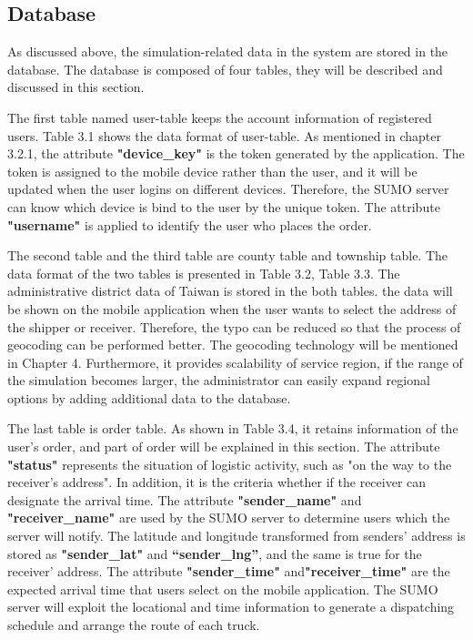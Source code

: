 \documentclass[12pt]{ksthesis}
\begin{document}
\begin{thesis}
{\section{Database}
As discussed above, the simulation-related data in the system are stored in the database. The database is composed of four tables, they will be described and discussed in this section.
 
The first table named user-table keeps the account information of registered users. Table 3.1 shows the data format of user-table. As mentioned in chapter 3.2.1, the attribute \textbf{"device\_key"} is the token generated by the application. The token is assigned to the mobile device rather than the user, and it will be updated when the user logins on different devices. Therefore, the SUMO server can know which device is bind to the user by the unique token. The attribute \textbf{"username"} is applied to identify the user who places the order. 

The second table and the third table are county table and township table. The data format of the two tables is presented in Table 3.2, Table 3.3. The administrative district data of Taiwan is stored in the both tables. the data will be shown on the mobile application when the user wants to select the address of the shipper or receiver. Therefore, the typo can be reduced so that the process of geocoding can be performed better. 
The geocoding technology will be mentioned in Chapter 4. Furthermore, it provides scalability of service region, if the range of the simulation becomes larger, the administrator can easily expand regional options by adding additional data to the database. 

The last table is order table. As shown in Table 3.4, it retains information of the user’s order, and part of order will be explained in this section. The attribute \textbf{"status"} represents the situation of logistic activity, such as "on the way to the receiver’s address". 
In addition, it is the criteria whether if the receiver can designate the arrival time. The attribute \textbf{"sender\_name"} and \textbf{"receiver\_name"} are used by the SUMO server to determine users which the server will notify. The latitude and longitude transformed from senders’ address is stored as\textbf{ "sender\_lat"} and \textbf{“sender\_lng”}, and the same is true for the receiver’ address. The attribute \textbf{"sender\_time"} and\textbf{"receiver\_time"} are the expected arrival time that users select on the mobile application. The SUMO server will exploit the locational and time information to generate a dispatching schedule and arrange the route of each truck. 

}
\end{thesis}
\end{document}
